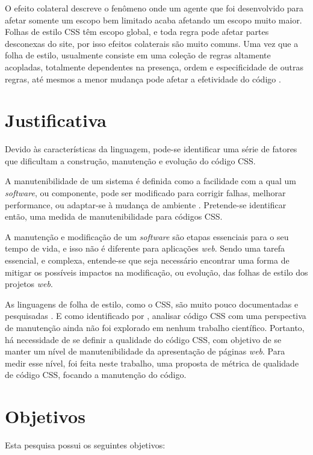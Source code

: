 O efeito colateral descreve o fenômeno onde um agente que foi desenvolvido para afetar somente um escopo bem limitado acaba afetando um escopo muito maior. Folhas de estilo CSS têm escopo global, e toda regra pode afetar partes desconexas do site, por isso efeitos colaterais são muito comuns. Uma vez que a folha de estilo, usualmente consiste em uma coleção de regras altamente acopladas, totalmente dependentes na presença, ordem e especificidade de outras regras, até mesmos a menor mudança pode afetar a efetividade do código \cite{Walton:2015}.

\section{Justificativa}

Devido às características da linguagem, pode-se identificar uma série de fatores que dificultam a construção, manutenção e evolução do código CSS. 

A manutenibilidade de um sistema é definida como a facilidade com a qual um \textit{software}, ou componente, pode ser modificado para corrigir falhas, melhorar performance, ou adaptar-se à mudança de ambiente \cite{Ieee1990}. Pretende-se identificar então, uma medida de manutenibilidade para códigos CSS.

A manutenção e modificação de um \textit{software} são etapas essenciais para o seu tempo de vida, e isso não é diferente para aplicações \textit{web}. Sendo uma tarefa essencial, e complexa, entende-se que seja necessário encontrar uma forma de mitigar os possíveis impactos na modificação, ou evolução, das folhas de estilo dos projetos \textit{web}.

As linguagens de folha de estilo, como o CSS, são muito pouco documentadas e pesquisadas \cite{Marden1999,Quint2007,Geneves2012}. E como identificado por , analisar código CSS com uma perspectiva de manutenção ainda não foi explorado em nenhum trabalho científico. Portanto, há necessidade de se definir a qualidade do código CSS, com objetivo de se manter um nível de manutenibilidade da apresentação de páginas \textit{web}. Para medir esse nível, foi feita neste trabalho, uma proposta de métrica de qualidade de código CSS, focando a manutenção do código.

\section{Objetivos}
Esta pesquisa possui os seguintes objetivos:

